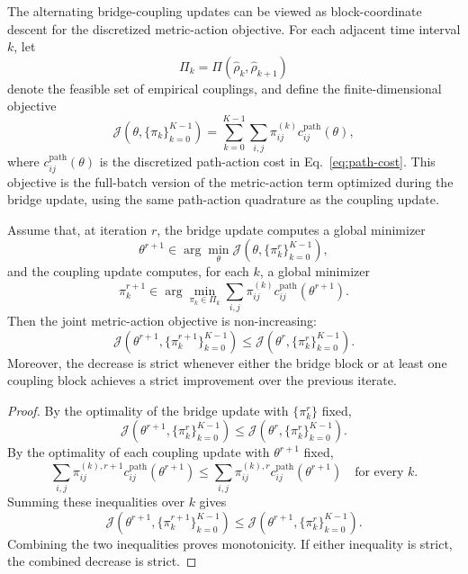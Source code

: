 The alternating bridge-coupling updates can be viewed as block-coordinate descent for the discretized metric-action objective. For each adjacent time interval \(k\), let
\[
\Pi_k=\Pi(\hat\rho_k,\hat\rho_{k+1})
\]
denote the feasible set of empirical couplings, and define the finite-dimensional objective
\begin{equation}
\label{eq:app-joint-action}
\mathcal{J}(\theta,\{\pi_k\}_{k=0}^{K-1})
=
\sum_{k=0}^{K-1}
\sum_{i,j}
\pi_{ij}^{(k)}
c_{ij}^{\mathrm{path}}(\theta),
\end{equation}
where \(c_{ij}^{\mathrm{path}}(\theta)\) is the discretized path-action cost in Eq.~\eqref{eq:path-cost}. This objective is the full-batch version of the metric-action term optimized during the bridge update, using the same path-action quadrature as the coupling update.

\begin{proposition}
\label{prop:ideal-bcd-monotonicity}
Assume that, at iteration \(r\), the bridge update computes a global minimizer
\[
\theta^{r+1}\in
\arg\min_{\theta}
\mathcal{J}(\theta,\{\pi_k^r\}_{k=0}^{K-1}),
\]
and the coupling update computes, for each \(k\), a global minimizer
\[
\pi_k^{r+1}
\in
\arg\min_{\pi_k\in\Pi_k}
\sum_{i,j}
\pi_{ij}^{(k)}
c_{ij}^{\mathrm{path}}(\theta^{r+1}).
\]
Then the joint metric-action objective is non-increasing:
\begin{equation}
\mathcal{J}(\theta^{r+1},\{\pi_k^{r+1}\}_{k=0}^{K-1})
\le
\mathcal{J}(\theta^{r},\{\pi_k^{r}\}_{k=0}^{K-1}).
\end{equation}
Moreover, the decrease is strict whenever either the bridge block or at least one coupling block achieves a strict improvement over the previous iterate.
\end{proposition}

\begin{proof}
By the optimality of the bridge update with \(\{\pi_k^r\}\) fixed,
\[
\mathcal{J}(\theta^{r+1},\{\pi_k^r\}_{k=0}^{K-1})
\le
\mathcal{J}(\theta^{r},\{\pi_k^r\}_{k=0}^{K-1}).
\]
By the optimality of each coupling update with \(\theta^{r+1}\) fixed,
\[
\sum_{i,j}\pi_{ij}^{(k),r+1}c_{ij}^{\mathrm{path}}(\theta^{r+1})
\le
\sum_{i,j}\pi_{ij}^{(k),r}c_{ij}^{\mathrm{path}}(\theta^{r+1})
\quad
\text{for every }k.
\]
Summing these inequalities over \(k\) gives
\[
\mathcal{J}(\theta^{r+1},\{\pi_k^{r+1}\}_{k=0}^{K-1})
\le
\mathcal{J}(\theta^{r+1},\{\pi_k^r\}_{k=0}^{K-1}).
\]
Combining the two inequalities proves monotonicity. If either inequality is strict, the combined decrease is strict.
\end{proof}

